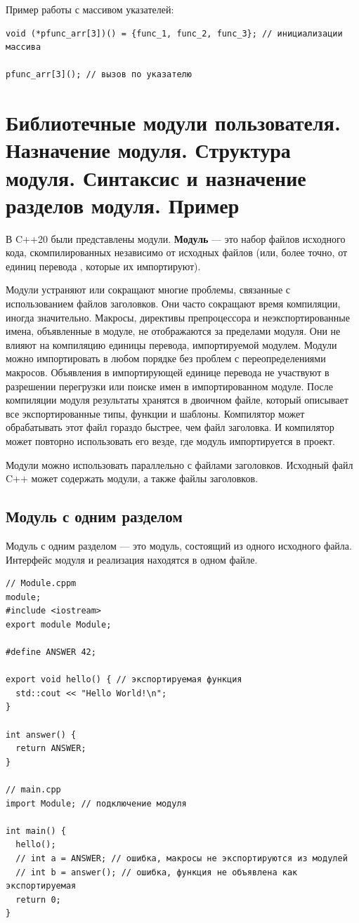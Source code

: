 Пример работы с массивом указателей:
\begin{verbatim}
void (*pfunc_arr[3])() = {func_1, func_2, func_3}; // инициализации массива

pfunc_arr[3](); // вызов по указателю
\end{verbatim}

\section{Библиотечные модули пользователя. Назначение модуля. Структура модуля. Синтаксис и назначение разделов модуля. Пример}

В C++20 были представлены модули. \textbf{Модуль} — это набор файлов исходного кода, скомпилированных независимо от исходных файлов (или, более точно, от единиц перевода , которые их импортируют).

Модули устраняют или сокращают многие проблемы, связанные с использованием файлов заголовков. Они часто сокращают время компиляции, иногда значительно. Макросы, директивы препроцессора и неэкспортированные имена, объявленные в модуле, не отображаются за пределами модуля. Они не влияют на компиляцию единицы перевода, импортируемой модулем. Модули можно импортировать в любом порядке без проблем с переопределениями макросов. Объявления в импортирующей единице перевода не участвуют в разрешении перегрузки или поиске имен в импортированном модуле. После компиляции модуля результаты хранятся в двоичном файле, который описывает все экспортированные типы, функции и шаблоны. Компилятор может обрабатывать этот файл гораздо быстрее, чем файл заголовка. И компилятор может повторно использовать его везде, где модуль импортируется в проект.

Модули можно использовать параллельно с файлами заголовков. Исходный файл C++ может содержать  модули, а также  файлы заголовков.

\subsection{Модуль с одним разделом}

Модуль с одним разделом — это модуль, состоящий из одного исходного файла. Интерфейс модуля и реализация находятся в одном файле.

\begin{verbatim}
// Module.cppm
module;
#include <iostream>
export module Module;

#define ANSWER 42;

export void hello() { // экспортируемая функция
  std::cout << "Hello World!\n";
}

int answer() {
  return ANSWER; 
}

// main.cpp
import Module; // подключение модуля

int main() {
  hello();
  // int a = ANSWER; // ошибка, макросы не экспортируются из модулей
  // int b = answer(); // ошибка, функция не объявлена как экспортируемая
  return 0;
}
\end{verbatim}

